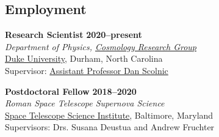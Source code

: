 \documentclass[margin]{res}
\begin{document}
\begin{resume}

\section{Employment} 

{\bf Research Scientist} \hfill {\bf 2020--present}\\
{\it Department of Physics, \href{https://phy.duke.edu/research/research-areas/astrophysics}{Cosmology Research Group}}\\
\href{https://phy.duke.edu}{Duke University}, Durham, North Carolina\\ 
Supervisor: \href{https://phy.duke.edu/people/daniel-m-scolnic}{Assistant Professor Dan Scolnic}

{\bf Postdoctoral Fellow} \hfill {\bf 2018--2020}\\
{\it Roman Space Telescope Supernova Science} \\
\href{http://www.stsci.edu}{Space Telescope Science Institute}, Baltimore, Maryland\\ 
Supervisors: Drs. Susana Deustua and Andrew Fruchter


 






\end{resume}
\end{document}
